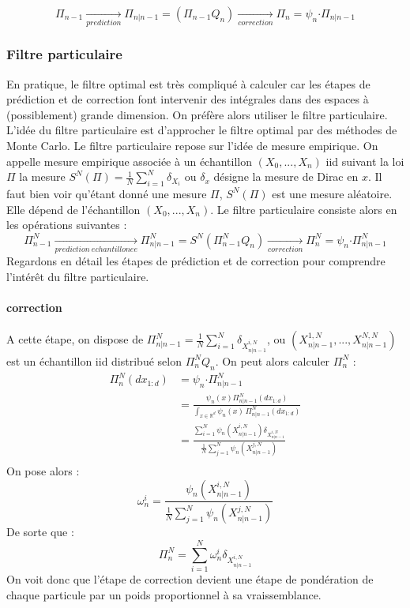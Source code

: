 \documentclass{article}
\begin{document}
\[\Pi_{n-1} \xrightarrow[prediction]{} \Pi_{n \vert n-1} = (\Pi_{n-1}Q_{n})\xrightarrow[correction]{}  \Pi_{n}=\psi_n \boldsymbol{\cdot}\Pi_{n \vert n-1}\]
\subsubsection{Filtre particulaire}

En pratique, le filtre optimal est très compliqué à calculer car les étapes de prédiction et de correction font intervenir des intégrales dans des espaces à (possiblement) grande dimension. On préfère alors utiliser le filtre particulaire.
L'idée du filtre particulaire est d'approcher le filtre optimal par des méthodes de Monte Carlo.
Le filtre particulaire repose sur l'idée de mesure empirique. On appelle mesure empirique associée à un échantillon $(X_0, ... , X_n)$ iid suivant la loi 
$\Pi$ la mesure $S^N(\Pi)= \frac{1}{N}\sum_{i=1}^{N} \delta_{X_i}$ ou $\delta_x$ désigne la mesure de Dirac en $x$. 
Il faut bien voir qu'étant donné une mesure $\Pi$, $S^{N}(\Pi)$ est une mesure aléatoire. Elle dépend de l'échantillon $(X_0, ... , X_n)$.
Le filtre particulaire consiste alors en les opérations suivantes : 
\[\Pi_{n-1}^N \xrightarrow[prediction ~ echantillonee]{} \Pi_{n \vert n-1}^N = S^N(\Pi_{n-1}^NQ_{n})\xrightarrow[correction]{}  \Pi_{n}^N=\psi_n \boldsymbol{\cdot}\Pi_{n \vert n-1}^N\]
Regardons en détail les étapes de prédiction et de correction pour comprendre l'intérêt du filtre particulaire.
\paragraph{correction}
A cette étape, on dispose de $\Pi^{N}_{n \vert n-1} = \frac{1}{N}\sum_{i=1}^{N} \delta_{X_{n \vert n-1}^{i,N}}$,
ou $(X_{n \vert n-1}^{1,N},...,X_{n \vert n-1}^{N,N} )$ est un échantillon iid distribué selon 
$\Pi_{n}^{N}Q_{n}$. 
On peut alors calculer $\Pi_{n}^{N}$ : 
\begin{align*}
   \Pi_{n}^{N}(dx_{1:d}) &= \psi_n \boldsymbol{\cdot} \Pi_{n \vert n-1}^N\\
   &=\frac{\psi_n(x)\Pi_{n \vert n-1}^N(dx_{1:d})}{\displaystyle{\int_{x \in \mathbb{R}^d} \psi_n(x)\,\Pi_{n \vert n-1}^N(dx_{1:d})}}\\
   &=\frac{\displaystyle{\sum_{i=1}^{N}\psi_n(X_{n \vert n-1}^{i,N})\delta_{X_{n \vert n-1}^{i,N}}}}{\frac{1}{N}\displaystyle{\sum_{j=1}^{N} \psi_{n}(X_{n \vert n-1}^{j,N})}}\\
\end{align*}
On pose alors : 
\[\omega_{n}^i= \frac{\psi_n(X_{n \vert n-1}^{i,N})}{\frac{1}{N}\displaystyle{\sum_{j=1}^{N} \psi_{n}(X_{n \vert n-1}^{j,N})}}\]
De sorte que :
\[\Pi_{n}^{N}= \sum_{i=1}^{N}\omega_{n}^{i}\delta_{X_{n \vert n-1}^{i,N}}\]
On voit donc que l'étape de correction devient une étape de pondération de chaque particule par un poids proportionnel à sa vraissemblance.
\end{document}
